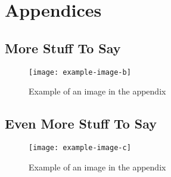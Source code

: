 \pagestyle{appendix}
\appendix
\section*{Appendices}
\renewcommand{\thesubsection}{\Alph{subsection}}

\lipsum[2]

\subsection{More Stuff To Say}

\begin{figure}[!htb]
    \centering
    \texttt{[image: example-image-b]}
    \caption{Example of an image in the appendix}
    \label{fig:appendix_a}
\end{figure}

\newpage    %

\subsection{Even More Stuff To Say}

\lipsum[3]

\begin{figure}[!htb]
    \centering
    \texttt{[image: example-image-c]}
    \caption{Example of an image in the appendix}
    \label{fig:appendix_b}
\end{figure}